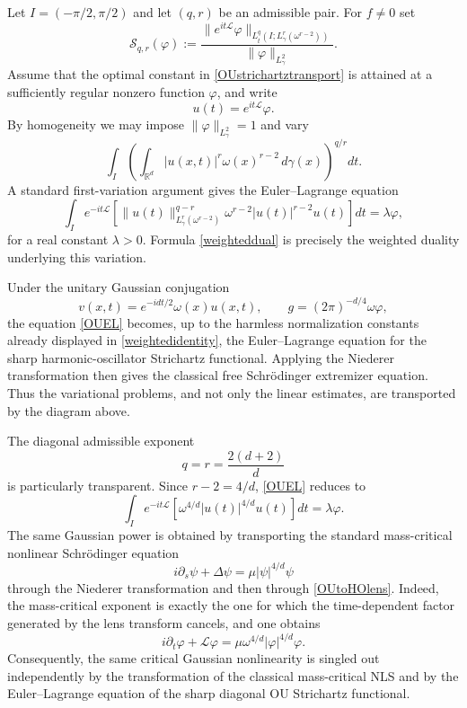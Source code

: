 \documentclass[11pt,a4paper]{amsart}
\def \vf{\varphi}
\numberwithin{equation}{section}
\numberwithin{equation}{section}
\begin{document}
Let $I=(-\pi/2,\pi/2)$ and let $(q,r)$ be an admissible pair.  For $f\neq0$ set
\begin{equation}\label{OUsharpfunctional}
 \mathcal S_{q,r}(\vf)
 :=\frac{\|e^{it\mathscr L}\vf\|_{L^q_t(I;L^r_\gamma(\omega^{r-2}))}}
 {\|\vf\|_{L^2_\gamma}}.
\end{equation}
Assume that the optimal constant in \eqref{OUstrichartztransport} is attained at a sufficiently regular nonzero function $\vf$, and write
\[
 u(t)=e^{it\mathscr L}\vf.
\]
By homogeneity we may impose $\|\vf\|_{L^2_\gamma}=1$ and vary
\[
 \int_I\left(\int_{\mathbb R^d}|u(x,t)|^r\omega(x)^{r-2}\,d\gamma(x)\right)^{q/r}dt.
\]
A standard first-variation argument gives the Euler--Lagrange equation
\begin{equation}\label{OUEL}
 \int_I e^{-it\mathscr L}\left[
 \|u(t)\|_{L^r_\gamma(\omega^{r-2})}^{q-r}
 \omega^{r-2}|u(t)|^{r-2}u(t)
 \right]dt
 =\lambda \vf,
\end{equation}
for a real constant $\lambda>0$.  Formula \eqref{weighteddual} is precisely the weighted duality underlying this variation.

Under the unitary Gaussian conjugation
\[
 v(x,t)=e^{-idt/2}\omega(x)u(x,t),\qquad g=(2\pi)^{-d/4}\omega \vf,
\]
the equation \eqref{OUEL} becomes, up to the harmless normalization constants already displayed in \eqref{weightedidentity}, the Euler--Lagrange equation for the sharp harmonic-oscillator Strichartz functional.  Applying the Niederer transformation then gives the classical free Schr\"odinger extremizer equation.  Thus the variational problems, and not only the linear estimates, are transported by the diagram above.

The diagonal admissible exponent
\begin{equation}\label{criticaldiag}
 q=r=\frac{2(d+2)}{d}
\end{equation}
is particularly transparent.  Since $r-2=4/d$, \eqref{OUEL} reduces to
\begin{equation}\label{OUELcritical}
 \int_I e^{-it\mathscr L}
 \left[\omega^{4/d}|u(t)|^{4/d}u(t)\right]dt
 =\lambda \vf.
\end{equation}
The same Gaussian power is obtained by transporting the standard mass-critical nonlinear Schr\"odinger equation
\begin{equation}\label{freecriticalNLS}
 i\partial_s\psi+\Delta\psi=\mu|\psi|^{4/d}\psi
\end{equation}
through the Niederer transformation and then through \eqref{OUtoHOlens}.  Indeed, the mass-critical exponent is exactly the one for which the time-dependent factor generated by the lens transform cancels, and one obtains
\begin{equation}\label{OUcriticalNLS}
 i\partial_t \vf+\mathscr L \vf
 =\mu\omega^{4/d}|\vf|^{4/d}\vf.
\end{equation}
Consequently, the same critical Gaussian nonlinearity is singled out independently by the transformation of the classical mass-critical NLS and by the Euler--Lagrange equation of the sharp diagonal OU Strichartz functional.
\end{document}
